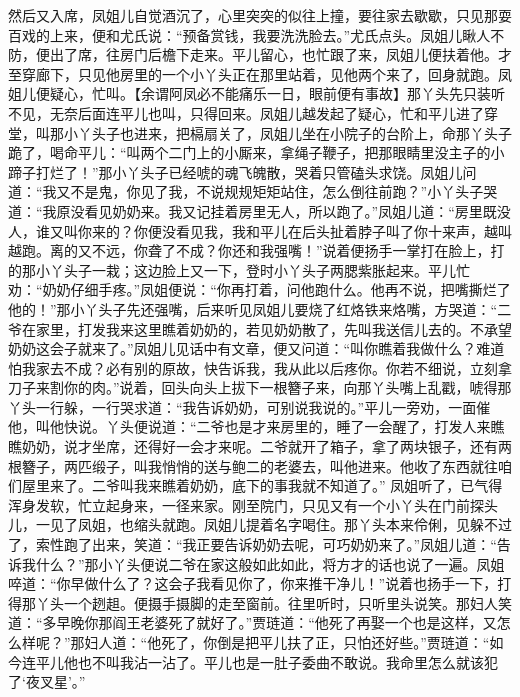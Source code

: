 \documentclass[12pt,oneside]{book}
\begin{document}
然后又入席，凤姐儿自觉酒沉了，心里突突的似往上撞，要往家去歇歇，只见那耍百戏的上来，便和尤氏说：“预备赏钱，我要洗洗脸去。”尤氏点头。凤姐儿瞅人不防，便出了席，往房门后檐下走来。平儿留心，也忙跟了来，凤姐儿便扶着他。才至穿廊下，只见他房里的一个小丫头正在那里站着，见他两个来了，回身就跑。凤姐儿便疑心，忙叫。【余谓阿凤必不能痛乐一日，眼前便有事故】那丫头先只装听不见，无奈后面连平儿也叫，只得回来。凤姐儿越发起了疑心，忙和平儿进了穿堂，叫那小丫头子也进来，把槅扇关了，凤姐儿坐在小院子的台阶上，命那丫头子跪了，喝命平儿：“叫两个二门上的小厮来，拿绳子鞭子，把那眼睛里没主子的小蹄子打烂了！”那小丫头子已经唬的魂飞魄散，哭着只管磕头求饶。凤姐儿问道：“我又不是鬼，你见了我，不说规规矩矩站住，怎么倒往前跑？”小丫头子哭道：“我原没看见奶奶来。我又记挂着房里无人，所以跑了。”凤姐儿道：“房里既没人，谁又叫你来的？你便没看见我，我和平儿在后头扯着脖子叫了你十来声，越叫越跑。离的又不远，你聋了不成？你还和我强嘴！”说着便扬手一掌打在脸上，打的那小丫头子一栽；这边脸上又一下，登时小丫头子两腮紫胀起来。平儿忙劝：“奶奶仔细手疼。”凤姐便说：“你再打着，问他跑什么。他再不说，把嘴撕烂了他的！”那小丫头子先还强嘴，后来听见凤姐儿要烧了红烙铁来烙嘴，方哭道：“二爷在家里，打发我来这里瞧着奶奶的，若见奶奶散了，先叫我送信儿去的。不承望奶奶这会子就来了。”凤姐儿见话中有文章，便又问道：“叫你瞧着我做什么？难道怕我家去不成？必有别的原故，快告诉我，我从此以后疼你。你若不细说，立刻拿刀子来割你的肉。”说着，回头向头上拔下一根簪子来，向那丫头嘴上乱戳，唬得那丫头一行躲，一行哭求道：“我告诉奶奶，可别说我说的。”平儿一旁劝，一面催他，叫他快说。丫头便说道：“二爷也是才来房里的，睡了一会醒了，打发人来瞧瞧奶奶，说才坐席，还得好一会才来呢。二爷就开了箱子，拿了两块银子，还有两根簪子，两匹缎子，叫我悄悄的送与鲍二的老婆去，叫他进来。他收了东西就往咱们屋里来了。二爷叫我来瞧着奶奶，底下的事我就不知道了。”
凤姐听了，已气得浑身发软，忙立起身来，一径来家。刚至院门，只见又有一个小丫头在门前探头儿，一见了凤姐，也缩头就跑。凤姐儿提着名字喝住。那丫头本来伶俐，见躲不过了，索性跑了出来，笑道：“我正要告诉奶奶去呢，可巧奶奶来了。”凤姐儿道：“告诉我什么？”那小丫头便说二爷在家这般如此如此，将方才的话也说了一遍。凤姐啐道：“你早做什么了？这会子我看见你了，你来推干净儿！”说着也扬手一下，打得那丫头一个趔趄。便摄手摄脚的走至窗前。往里听时，只听里头说笑。那妇人笑道：“多早晚你那阎王老婆死了就好了。”贾琏道：“他死了再娶一个也是这样，又怎么样呢？”那妇人道：“他死了，你倒是把平儿扶了正，只怕还好些。”贾琏道：“如今连平儿他也不叫我沾一沾了。平儿也是一肚子委曲不敢说。我命里怎么就该犯了‘夜叉星’。”
\end{document}

